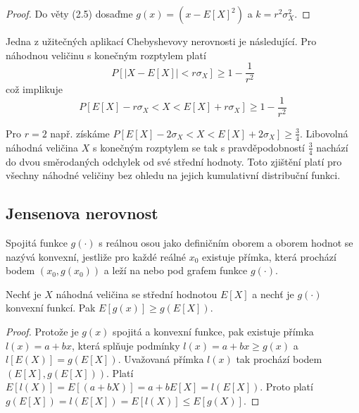 \begin{proof}
Do věty (2.5) dosaďme $g(x) = (x - E[X]^2)$ a $k = r^2 \sigma_X^2$.
\end{proof}

Jedna z užitečných aplikací Chebyshevovy nerovnosti je následující. Pro náhodnou veličinu s konečným rozptylem platí
\begin{equation*}
P[|X - E[X]| < r \sigma_X] \ge 1 - \frac{1}{r^2}
\end{equation*}
což implikuje
\begin{equation*}
P[E[X] - r \sigma_X < X < E[X] + r \sigma_X] \ge 1 - \frac{1}{r^2}
\end{equation*}

\begin{example}
Pro $r = 2$ např. získáme $P[E[X] - 2 \sigma_X < X < E[X] + 2 \sigma_X] \ge \frac{3}{4}$. Libovolná náhodná veličina $X$ s konečným rozptylem se tak s pravděpodobností $\frac{3}{4}$ nachází do dvou směrodaných odchylek od své střední hodnoty. Toto zjištění platí pro všechny náhodné veličiny bez ohledu na jejich kumulativní distribuční funkci.
\end{example}

\subsection{Jensenova nerovnost}

\begin{definition}
Spojitá funkce $g(\cdot)$ s reálnou osou jako definičním oborem a oborem hodnot se nazývá konvexní, jestliže pro každé reálné $x_0$ existuje přímka, která prochází bodem $(x_0, g(x_0))$ a leží na nebo pod grafem funkce $g(\cdot)$.
\end{definition}

\begin{theorem}
Nechť je $X$ náhodná veličina se střední hodnotou $E[X]$ a nechť je $g(\cdot)$ konvexní funkcí. Pak $E[g(x)] \ge g(E[X])$.
\end{theorem}

\begin{proof}
Protože je $g(x)$ spojitá a konvexní funkce, pak existuje přímka $l(x) = a + bx$, která splňuje podmínky $l(x) = a + bx \ge g(x)$ a $l[E(X)] = g(E[X])$. Uvažovaná přímka $l(x)$ tak prochází bodem $(E[X], g(E[X]))$. Platí $E[l(X)] = E[(a + bX)] = a + bE[X] = l(E[X])$. Proto platí $g(E[X]) = l(E[X]) = E[l(X)] \le E[g(X)]$.
\end{proof}

